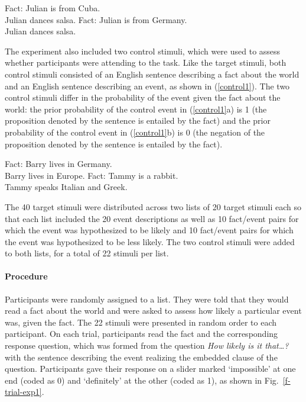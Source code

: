 \documentclass[11pt,fleqn]{article}
\newcommand{\6}{\mbox{$[\hspace*{-.6mm}[$}}
\newcommand{\9}{\mbox{$]\hspace*{-.6mm}]$}}
\newcommand{\figref}[1]{Fig.~\ref{#1}}
\begin{document}
\begin{exe}
\ex\label{event}
\begin{xlist}
\ex Fact: Julian is from Cuba.
\\Julian dances salsa.
\ex Fact: Julian is from Germany.
\\ Julian dances salsa.
\end{xlist}
\end{exe}

The experiment also included two control stimuli, which were used to assess whether participants were attending to the task. Like the target stimuli, both control stimuli consisted of an English sentence describing a fact about the world and an English sentence describing an event, as shown in (\ref{control1}). The two control stimuli differ in the probability of the event given the fact about the world: the prior probability of the control event in (\ref{control1}a) is 1 (the proposition denoted by the sentence is entailed by the fact) and the prior probability of the control event in (\ref{control1}b) is 0 (the negation of the proposition denoted by the sentence is entailed by the fact).

\begin{exe}
\ex\label{control1}
\begin{xlist}
\ex Fact: Barry lives in Germany.
\\ Barry lives in Europe.
\ex Fact: Tammy is a rabbit.
\\ Tammy speaks Italian and Greek.
\end{xlist}
\end{exe}

The 40 target stimuli were distributed across two lists of 20 target stimuli each so that each list included the 20 event descriptions as well as 10 fact/event pairs for which the event was hypothesized to be likely and 10 fact/event pairs for which the event was hypothesized to be less likely. The two control stimuli were added to both lists, for a total of 22 stimuli per list. 

\paragraph{Procedure} Participants were randomly assigned to a list. They were told that they would read a fact about the world and were asked to assess how likely a particular event was, given the fact. The 22 stimuli were presented in random order to each participant. On each trial, participants read the fact and the corresponding response question, which was formed from the question {\em How likely is it that\ldots ?} with the sentence describing the event realizing the embedded clause of the question. Participants gave their response on a slider marked `impossible' at one end (coded as 0) and `definitely' at the other (coded as 1), as shown in \figref{f-trial-exp1}. 
\end{document}
